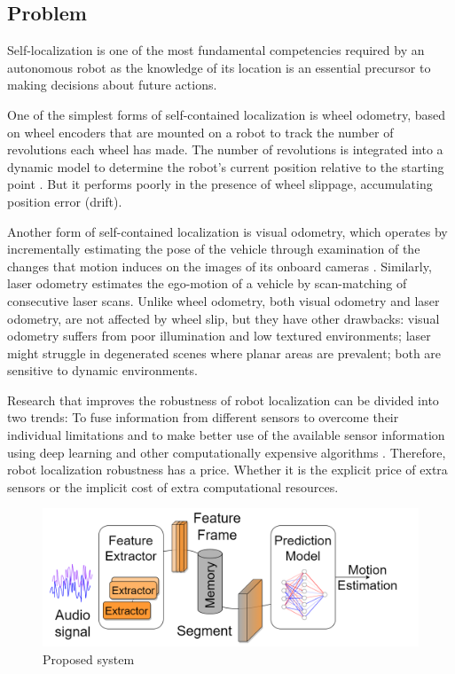 \subsection{Problem} \label{subsec:problem}

Self-localization is one of the most fundamental competencies required by an
autonomous robot as the knowledge of its location is an essential precursor to
making decisions about future actions.

One of the simplest forms of self-contained localization is wheel odometry,
based on wheel encoders that are mounted on a robot to track the number of
revolutions each wheel has made. The number of revolutions is integrated into a
dynamic model to determine the robot's current position relative to the
starting point \cite{OdometrySurvey}. But it performs poorly in the presence of
wheel slippage, accumulating position error (drift).

Another form of self-contained localization is visual odometry, which operates
by incrementally estimating the pose of the vehicle through examination of the
changes that motion induces on the images of its onboard cameras
\cite{ScaramuzzaTutorial}. Similarly, laser odometry estimates the ego-motion
of a vehicle by scan-matching of consecutive laser scans. Unlike wheel
odometry, both visual odometry and laser odometry, are not affected by wheel
slip, but they have other drawbacks: visual odometry suffers from poor
illumination and low textured environments; laser might struggle in degenerated
scenes where planar areas are prevalent; both are sensitive to dynamic
environments.

Research that improves the robustness of robot localization can be divided into
two trends: To fuse information from different sensors to overcome their
individual limitations \cite{Valente2019,Vargas2021,Ojeda2006} and to make
better use of the available sensor information using deep learning and other
computationally expensive algorithms \cite{Long2021,DFVO}. Therefore, robot
localization robustness has a price. Whether it is the explicit price of extra
sensors or the implicit cost of extra computational resources.

\begin{figure}[t]
    \centering
    \includegraphics[width=\linewidth]{content/system.drawio.png}
    \caption{Proposed system}
    \label{fig:system}
\end{figure}

